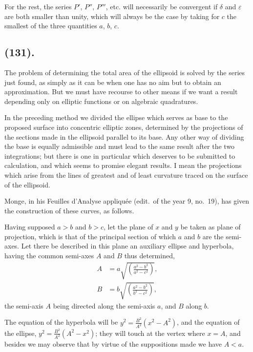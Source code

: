 \documentclass{article}
\begin{document}
For the rest, the series $P'$, $P''$, $P'''$, etc. will necessarily be convergent if $\delta$ and $\varepsilon$ are both smaller than unity, which will always be the case by taking for $c$ the smallest of the three quantities $a$, $b$, $c$.

\subsection*{(131).}

The problem of determining the total area of the ellipsoid is solved by the series just found, as simply as it can be when one has no aim but to obtain an approximation. But we must have recourse to other means if we want a result depending only on elliptic functions or on algebraic quadratures.

In the preceding method we divided the ellipse which serves as base to the proposed surface into concentric elliptic zones, determined by the projections of the sections made in the ellipsoid parallel to its base. Any other way of dividing the base is equally admissible and must lead to the same result after the two integrations; but there is one in particular which deserves to be submitted to calculation, and which seems to promise elegant results. I mean the projections which arise from the lines of greatest and of least curvature traced on the surface of the ellipsoid.

Monge, in his Feuilles d'Analyse appliquée (edit.\ of the year 9, no.~19), has given the construction of these curves, as follows.

Having supposed $a>b$ and $b>c$, let the plane of $x$ and $y$ be taken as plane of projection, which is that of the principal section of which $a$ and $b$ are the semi-axes. Let there be described in this plane an auxiliary ellipse and hyperbola, having the common semi-axes $A$ and $B$ thus determined,
\[ \begin{aligned} A&=a\sqrt{\left(\frac{a^{2}-b^{2}}{a^{2}-c^{2}}\right)},\\ B&=b\sqrt{\left(\frac{a^{2}-b^{2}}{b^{2}-c^{2}}\right)}, \end{aligned} \]
the semi-axis $A$ being directed along the semi-axis $a$, and $B$ along $b$.

The equation of the hyperbola will be $y^{2}=\frac{B^{2}}{A^{2}}(x^{2}-A^{2})$, and the equation of the ellipse, $y^{2}=\frac{B^{2}}{A^{2}}(A^{2}-x^{2})$; they will touch at the vertex where $x=A$, and besides we may observe that by virtue of the suppositions made we have $A<a$.
\end{document}
